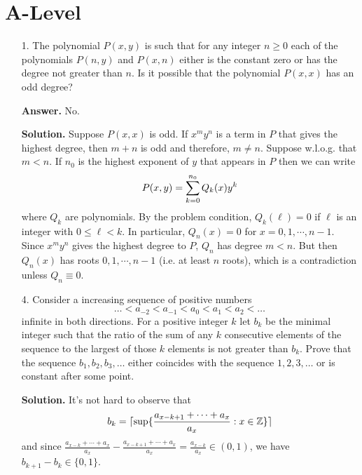 \documentclass[11pt,a4paper]{article}
\begin{document}
\section*{A-Level}
\begin{enumerate}
	\item[1.] The polynomial $P(x,y)$ is such that for any integer $n \ge 0$ each of the polynomials $P(n, y)$ and $P(x, n)$ either is the constant zero or has the degree not greater than $n$. Is it possible that the polynomial $P(x, x)$ has an odd degree?
	
	\textbf{Answer.} No. 
	
	\textbf{Solution.} Suppose $P(x, x)$ is odd. If $x^my^n$ is a term in $P$ that gives the highest degree, then $m+n$ is odd and therefore, $m\neq n$. Suppose w.l.o.g. that $m<n$. If $n_0$ is the highest exponent of $y$ that appears in $P$ then we can write 
	\[
	P(x, y)=\displaystyle\sum_{k=0}^{n_0}Q_k(x)y^k
	\] 
	where $Q_k$ are polynomials. By the problem condition, $Q_k(\ell)=0$ if $\ell$ is an integer with $0\le \ell < k$. In particular, $Q_n(x)=0$ for $x=0, 1, \cdots , n-1$. Since $x^my^n$ gives the highest degree to $P$, $Q_n$ has degree $m<n$. But then $Q_n(x)$ has roots $0, 1, \cdots , n-1$ (i.e. at least $n$ roots), which is a contradiction unless $Q_n\equiv 0$. 
	
	\item[4.] Consider a increasing sequence of positive numbers
	\[\ldots <a_{-2} < a_{-1} <a_0 <a_1 <a_2 <\ldots\]
	infinite in both directions. For a positive integer $k$ let $b_k$ be the minimal integer such that the ratio of the sum of any $k$ consecutive elements of the sequence to the largest of those $k$ elements is not greater than $b_k$. Prove that the sequence $b_1, b_2, b_3, \ldots$ either coincides with the sequence $1, 2, 3, \ldots$ or is constant after some point.
	
	\textbf{Solution.} It's not hard to observe that 
	\[
	b_k = \lceil\sup\{\frac{a_{x-k+1}+\cdots + a_x}{a_x}: x\in\mathbb{Z}\}\rceil
	\]
	and since $\frac{a_{x-k}+\cdots + a_x}{a_x}-\frac{a_{x-k+1}+\cdots + a_x}{a_x}=\frac{a_{x-k}}{a_x}\in (0, 1)$, we have $b_{k+1}-b_k\in \{0, 1\}$. 
	

\end{enumerate}
\end{document}
